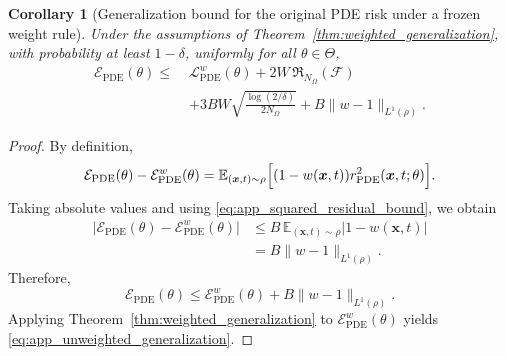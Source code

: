 \documentclass{article}
\theoremstyle{plain}
\newtheorem{corollary}[theorem]{Corollary}
\theoremstyle{definition}
\theoremstyle{remark}
\begin{document}
\begin{corollary}[Generalization bound for the original PDE risk under a frozen weight rule]
	\label{cor:unweighted_generalization}
	Under the assumptions of
	Theorem~\ref{thm:weighted_generalization}, with probability at least
	$1-\delta$, uniformly for all $\theta\in\Theta$,
	\begin{equation}
		\begin{aligned}
			\mathcal{E}_{\mathrm{PDE}}(\theta)
			\leqslant\;&
			\mathcal{L}_{\mathrm{PDE}}^{w}(\theta)
			+
			2W\,\mathfrak{R}_{N_{\Omega}}(\mathcal{F}) \\
			&+
			3BW\sqrt{\frac{\log(2/\delta)}{2N_{\Omega}}}
			+
			B\|w-1\|_{L^1(\rho)}.
		\end{aligned}
		\label{eq:app_unweighted_generalization}
	\end{equation}
\end{corollary}

\begin{proof}
	By definition,
	\begin{equation}
		\mathcal{E}_{\mathrm{PDE}}(\theta)
		-
		\mathcal{E}_{\mathrm{PDE}}^{w}(\theta)
		=
		\mathbb{E}_{(\boldsymbol{x},t)\sim \rho}
		\Bigl[
		(1-w(\boldsymbol{x},t))
		r_{\mathrm{PDE}}^2(\boldsymbol{x},t;\theta)
		\Bigr].
		\label{eq:app_bias_decomposition}
	\end{equation}
	Taking absolute values and using
	\eqref{eq:app_squared_residual_bound}, we obtain
	\begin{equation}
		\begin{aligned}
			\bigl|
			\mathcal{E}_{\mathrm{PDE}}(\theta)
			-
			\mathcal{E}_{\mathrm{PDE}}^{w}(\theta)
			\bigr|
			&\leqslant
			B\,
			\mathbb{E}_{(\boldsymbol{x},t)\sim \rho}
			|1-w(\boldsymbol{x},t)| \\
			&=
			B\|w-1\|_{L^1(\rho)}.
		\end{aligned}
		\label{eq:app_bias_bound}
	\end{equation}
	Therefore,
	\begin{equation}
		\mathcal{E}_{\mathrm{PDE}}(\theta)
		\leqslant
		\mathcal{E}_{\mathrm{PDE}}^{w}(\theta)
		+
		B\|w-1\|_{L^1(\rho)}.
		\label{eq:app_transfer_to_unweighted}
	\end{equation}
	Applying Theorem~\ref{thm:weighted_generalization} to
	$\mathcal{E}_{\mathrm{PDE}}^{w}(\theta)$ yields
	\eqref{eq:app_unweighted_generalization}.
\end{proof}
\end{document}
